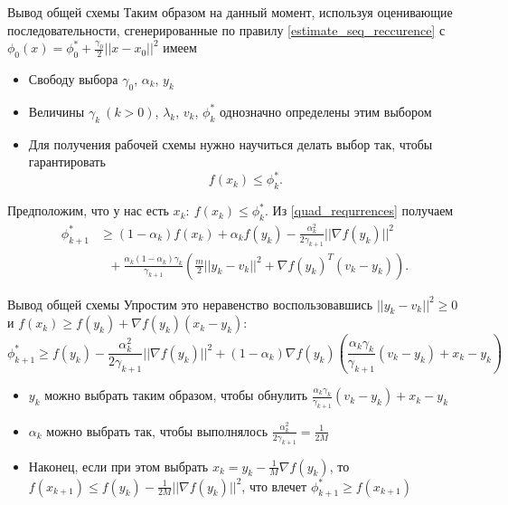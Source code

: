 \documentclass[10pt, handout]{beamer}
\begin{document}
\begin{frame}{Вывод общей схемы}
Таким образом на данный момент, используя оценивающие последовательности, сгенерированные по правилу \eqref{estimate_seq_reccurence} с $\phi_0(x)=\phi_0^*+\frac{\gamma_0}{2}||x-x_0||^2$ имеем
\pause
\begin{itemize}[<+->]
\item Свободу выбора $\gamma_0$, $\alpha_k$, $y_k$
\item Величины $\gamma_k~(k>0)$, $\lambda_k$, $v_k$, $\phi_k^*$ однозначно определены этим выбором
\item Для получения рабочей схемы нужно научиться делать выбор так, чтобы гарантировать
$$
f(x_{k})\leq \phi_{k}^*.
$$
\end{itemize}
\pause
Предположим, что у нас есть $x_k:~f(x_k)\leq \phi_k^*$. Из \eqref{quad_requrrences} получаем
\begin{align*}
\phi_{k+1}^*&\geq(1-\alpha_k)f(x_k)+\alpha_kf(y_k)-\frac{\alpha_k^2}{2\gamma_{k+1}}||\nabla f(y_k)||^2\\
&~~~+\frac{\alpha_k(1-\alpha_k)\gamma_k}{\gamma_{k+1}}
\left(\frac{m}{2}||y_k-v_k||^2+\nabla f(y_k)^T(v_k-y_k)\right).
\end{align*}

\end{frame}

\begin{frame}{Вывод общей схемы}
Упростим это неравенство воспользовавшись $||y_k-v_k||^2\geq 0$ и $f(x_k)\geq f(y_k)+\nabla f(y_k)(x_k-y_k)$:
$$
\phi_{k+1}^*\geq f(y_k)-\frac{\alpha_k^2}{2\gamma_{k+1}}||\nabla f(y_k)||^2+(1-\alpha_k)\nabla f(y_k)\left(\frac{\alpha_k\gamma_k}{\gamma_{k+1}}(v_k-y_k)+x_k-y_k\right)
$$
\pause
\begin{itemize}[<+->]
\item $y_k$ можно выбрать таким образом, чтобы обнулить $\frac{\alpha_k\gamma_k}{\gamma_{k+1}}(v_k-y_k)+x_k-y_k$
\item $\alpha_k$ можно выбрать так, чтобы выполнялось $\frac{\alpha_k^2}{2\gamma_{k+1}}=\frac{1}{2M}$
\item Наконец, если при этом выбрать $x_k=y_k-\frac{1}{M}\nabla f(y_k)$, то $f(x_{k+1})\leq f(y_k)-\frac{1}{2M}||\nabla f(y_k)||^2$, что влечет $\phi_{k+1}^*\geq f(x_{k+1})$
\end{itemize}
\end{frame}
\end{document}
